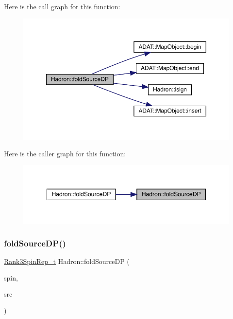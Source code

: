 Here is the call graph for this function\+:\nopagebreak
\begin{figure}[H]
\begin{center}
\leavevmode
\includegraphics[width=350pt]{d1/daf/namespaceHadron_a3ea046027140669df443a45763de3e2c_cgraph}
\end{center}
\end{figure}
Here is the caller graph for this function\+:\nopagebreak
\begin{figure}[H]
\begin{center}
\leavevmode
\includegraphics[width=348pt]{d1/daf/namespaceHadron_a3ea046027140669df443a45763de3e2c_icgraph}
\end{center}
\end{figure}
\mbox{\label{namespaceHadron_a9a1884dbfb0a2eb11bd7d4e6585e6966}} 
\subsubsection{\texorpdfstring{foldSourceDP()}{foldSourceDP()}\hspace{0.1cm}{\footnotesize\ttfamily [4/7]}}
{\footnotesize\ttfamily \mbox{\hyperlink{structHadron_1_1Rank3SpinRep__t}{Rank3\+Spin\+Rep\+\_\+t}} Hadron\+::fold\+Source\+DP (\begin{DoxyParamCaption}\item[{const \mbox{\hyperlink{structHadron_1_1Rank3SpinRep__t}{Rank3\+Spin\+Rep\+\_\+t}} \&}]{spin,  }\item[{bool}]{src }\end{DoxyParamCaption})}



